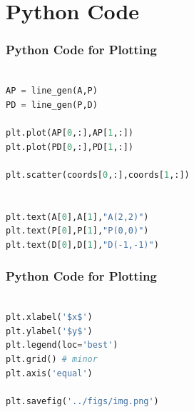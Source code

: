 \documentclass{beamer}
\theoremstyle{remark}
\numberwithin{equation}{section}
\begin{document}
\section{Python Code}
\begin{frame}[fragile]
\frametitle{Python Code for Plotting}
\begin{lstlisting}[language=Python]   

AP = line_gen(A,P)
PD = line_gen(P,D)

plt.plot(AP[0,:],AP[1,:])
plt.plot(PD[0,:],PD[1,:])

plt.scatter(coords[0,:],coords[1,:])


plt.text(A[0],A[1],"A(2,2)")
plt.text(P[0],P[1],"P(0,0)")
plt.text(D[0],D[1],"D(-1,-1)")


\end{lstlisting}

\end{frame}
\begin{frame}[fragile]
\frametitle{Python Code for Plotting}
\begin{lstlisting}[language=Python]   

plt.xlabel('$x$')
plt.ylabel('$y$')
plt.legend(loc='best')
plt.grid() # minor
plt.axis('equal')

plt.savefig('../figs/img.png')



\end{lstlisting}

\end{frame}
\end{document}
